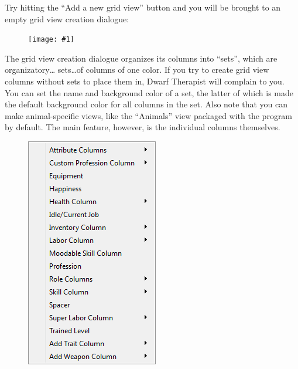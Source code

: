 \documentclass[]{article}
\newcommand{\fullfigure}[1] {
\begin{figure}[h!]
\texttt{[image: \#1]}
\end{figure}
}
\begin{document}
Try hitting the ``Add a new grid view'' button and you will be brought to an empty grid view creation
dialogue:
\vspace{24pt}

\fullfigure{Sec3Fig13+}

The grid view creation dialogue organizes its columns into ``sets'', which are organizatory\ldots
sets\ldots of columns of one color. If you try to create grid view columns without sets to place them in,
Dwarf Therapist will complain to you. You can set the name and background color of a set, the latter of
which is made the default background color for all columns in the set. Also note that you can make
animal-specific views, like the ``Animals'' view packaged with the program by default. The main feature,
however, is the individual columns themselves.

\begin{figure}
\vspace{-20pt}
  \begin{center}
    \includegraphics[width=\linewidth]{Sec3Fig13+1}
  \end{center}
\vspace{-100pt}
\end{figure}
\end{document}
